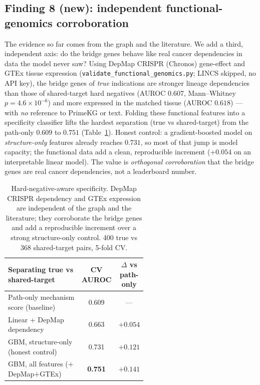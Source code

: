 \documentclass[11pt]{article}
\begin{document}
\subsection{Finding 8 (new): independent functional-genomics corroboration}
The evidence so far comes from the graph and the literature. We add a third, independent
axis: do the bridge genes behave like real cancer dependencies in data the model never saw?
Using DepMap CRISPR (Chronos) gene-effect and GTEx tissue expression
(\texttt{validate\_functional\_genomics.py}; LINCS skipped, no API key), the bridge genes of
\emph{true} indications are stronger lineage dependencies than those of shared-target hard
negatives (AUROC $0.607$, Mann--Whitney $p=4.6\times10^{-6}$) and more expressed in the
matched tissue (AUROC $0.618$) --- with \emph{no} reference to PrimeKG or text. Folding these
functional features into a specificity classifier lifts the hardest separation (true vs
shared-target) from the path-only $0.609$ to $0.751$ (Table~\ref{tab:funcgen}). Honest
control: a gradient-boosted model on \emph{structure-only} features already reaches $0.731$,
so most of that jump is model capacity; the functional data add a clean, reproducible
increment ($+0.054$ on an interpretable linear model). The value is \emph{orthogonal
corroboration} that the bridge genes are real cancer dependencies, not a leaderboard number.

\begin{table}[H]
\centering\small
\begin{tabular}{>{\raggedright\arraybackslash}p{0.55\linewidth} c c}
\toprule
\rowcolor{sriblue}\color{white}\textbf{Separating true vs shared-target} & \color{white}\textbf{CV AUROC} & \color{white}\textbf{$\Delta$ vs path-only}\\
\midrule
\rowcolor{srirow} Path-only mechanism score (baseline) & 0.609 & ---\\
Linear $+$ DepMap dependency & 0.663 & $+0.054$\\
\rowcolor{srirow} GBM, structure-only (honest control) & 0.731 & $+0.121$\\
GBM, all features ($+$DepMap$+$GTEx) & \textbf{0.751} & $+0.141$\\
\bottomrule
\end{tabular}
\caption{Hard-negative-aware specificity. DepMap CRISPR dependency and GTEx expression are
independent of the graph and the literature; they corroborate the bridge genes and add a
reproducible increment over a strong structure-only control. 400 true vs 368 shared-target
pairs, 5-fold CV.}
\label{tab:funcgen}
\end{table}
\end{document}
